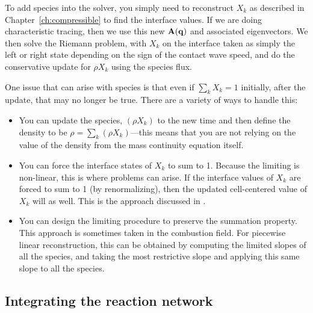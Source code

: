 To add species into the solver, you simply need to reconstruct $X_k$
as described in Chapter~\ref{ch:compressible} to find the interface values.  If we 
are doing characteristic tracing, then we use this new ${\bf A}({\bf q})$
and associated eigenvectors.  We then solve the Riemann problem, with $X_k$ on
the interface taken as simply the left or right state depending on the
sign of the contact wave speed, and do the conservative update for
$\rho X_k$ using the species flux.


One issue that can arise with species is that even if $\sum_k X_k = 1$
initially, after the update, that may no longer be true.  There are a
variety of ways to handle this:
\begin{itemize}
\item You can update the species, $(\rho X_k)$ to the new time and then
define the density to be $\rho = \sum_k (\rho X_k)$---this means that
you are not relying on the value of the density from the mass continuity
equation itself.

\item You can force the interface states of $X_k$ to sum to 1.  Because
the limiting is non-linear, this is where problems can arise.  If the
interface values of $X_k$ are forced to sum to 1 (by renormalizing), then
the updated cell-centered value of $X_k$ will as well.  This is the
approach discussed in \cite{plewamuller:1999}.

\item You can design the limiting procedure to preserve the summation
property.  This approach is sometimes taken in the combustion field.
For piecewise linear reconstruction, this can be obtained by computing
the limited slopes of all the species, and taking the most restrictive
slope and applying this same slope to all the species.
\end{itemize}


\subsection{Integrating the reaction network}

